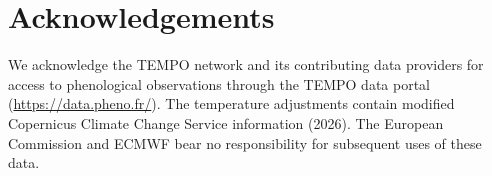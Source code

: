 \documentclass[a4paper,12pt]{article}
\let\OriginalSection\section
\renewcommand{\section}{\FloatBarrier\OriginalSection}
\begin{document}
\section*{Acknowledgements}

We acknowledge the TEMPO network and its contributing data providers for access
to phenological observations through the TEMPO data portal
(\url{https://data.pheno.fr/}). The temperature adjustments contain modified
Copernicus Climate Change Service information (2026). The European Commission
and ECMWF bear no responsibility for subsequent uses of these data.



\end{document}
